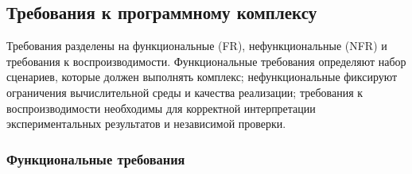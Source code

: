 \documentclass[12pt, a4paper]{article}
\theoremstyle{definition}
\theoremstyle{remark}
\begin{document}
\subsection{Требования к программному комплексу}
\label{sec:software_requirements}

Требования разделены на функциональные (FR), нефункциональные (NFR) и требования к воспроизводимости. Функциональные требования определяют набор сценариев, которые должен выполнять комплекс; нефункциональные фиксируют ограничения вычислительной среды и качества реализации; требования к воспроизводимости необходимы для корректной интерпретации экспериментальных результатов и независимой проверки.

\subsubsection{Функциональные требования}
\end{document}

